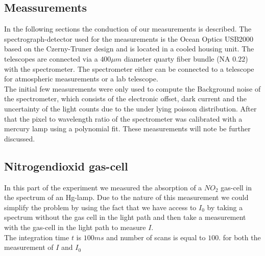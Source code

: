\documentclass[12pt, english]{scrartcl} %
\begin{document}
\begin{multicols}{2}
\section{Meassurements}
In the following sections the conduction of our measurements is described. The spectrograph-detector used for the measurements is the Ocean Optics USB2000 based on the Czerny-Truner design and is located in a cooled housing unit. 
The telescopes are connected via a $400 \mu m$ diameter quarty fiber bundle (NA $0.22$) with the spectrometer. The spectrometer either can be connected to a telescope for atmospheric measurements or a lab telescope. \\
The initial few measurements were only used to compute the Background noise of the spectrometer, which consists of the electronic offset, dark current and the uncertainty of the light counts due to the under lying poisson distribution. After that the pixel to wavelength ratio of the spectrometer was calibrated with a mercury lamp using a polynomial fit. These measurements will note be further discussed.\\
\subsection{Nitrogendioxid gas-cell}
In this part of the experiment we measured the absorption of a $NO_2$ gas-cell in the spectrum of an Hg-lamp. Due to the nature of this measurement we could simplify the problem by using the fact that we have access to $I_0$ by taking a spectrum without the gas cell in the light path and then take a measurement with the gas-cell in the light path to measure $I$.\\
The integration time $t$ is $100ms$ and number of scans is equal to $100$. for both the measurement of $I$ and $I_0$

\end{multicols}
\end{document}
